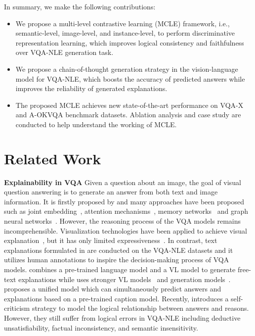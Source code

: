 \documentclass[letterpaper]{article} %
\begin{document}
In summary, we make the following contributions:
\begin{itemize}
	\item We propose a multi-level contrastive learning (MCLE) framework, i.e., semantic-level, image-level, and instance-level, to perform discriminative representation learning, which improves logical consistency and faithfulness over VQA-NLE generation task.
	\item We propose a chain-of-thought generation strategy in the vision-language model for VQA-NLE, which boosts the accuracy of predicted answers while improves the reliability of generated explanations.
	\item The proposed MCLE achieves new state-of-the-art performance on VQA-X and A-OKVQA benchmark datasets. Ablation analysis and case study are conducted to help understand the working of MCLE.
\end{itemize}

\section{Related Work}
\noindent
\textbf{Explainability in VQA} Given a question about an image, the goal of visual question answering is to generate an answer from both text and image information. It is firstly proposed by \cite{malinowski2014multi} and many approaches have been proposed such as joint embedding~\cite{dong2018predicting,yao2019hierarchy}, attention mechanisms~\cite{anderson2018bottom,lu2016hierarchical}, memory networks~\cite{ma2018visual,xiong2016dynamic} and graph neural networks~\cite{kipf2016semi,velickovic2017graph}. However, the reasoning process of the VQA models remains incomprehensible. Visualization technologies have been applied to achieve visual explanation~\cite{selvaraju2017grad,patro2019u}, but it has only limited expressiveness~\cite{wu2019self}. In contrast, text explanations formulated in \cite{park2018multimodal} are conducted on the VQA-NLE datasets and it utilizes human annotations to inspire the decision-making process of VQA models. \cite{kayser2021vil} combines a pre-trained language model and a VL model to generate free-text explanations while \cite{yang2022chunk} uses stronger VL models~\cite{li2020oscar} and generation models~\cite{radford2019language}. \cite{sammani2022nlx} proposes a unified model which can simultaneously predict answers and explanations based on a pre-trained caption model. Recently, \cite{suo2023s3c} introduces a self-criticism strategy to model the logical relationship between answers and reasons. However, they still suffer from logical errors in VQA-NLE including deductive unsatisfiability, factual inconsistency, and semantic insensitivity.
\end{document}
